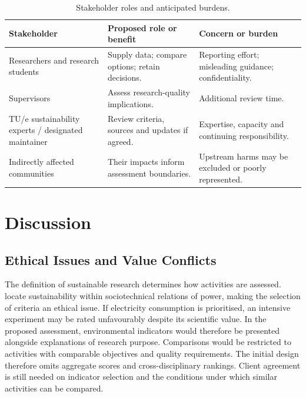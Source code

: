 \documentclass[11pt,a4paper]{article}
\begin{document}
\begin{table}[!htbp]
\centering\small
\begin{tabularx}{\textwidth}{@{}>{\raggedright\arraybackslash}p{}>{\raggedright\arraybackslash}X>{\raggedright\arraybackslash}X@{}}
\toprule
Stakeholder & Proposed role or benefit & Concern or burden \\
\midrule
Researchers and research students & Supply data; compare options; retain decisions. & Reporting effort; misleading guidance; confidentiality. \\
\midrule
Supervisors & Assess research-quality implications. & Additional review time. \\
\midrule
TU/e sustainability experts / designated maintainer & Review criteria, sources and updates if agreed. & Expertise, capacity and continuing responsibility. \\
\midrule
Indirectly affected communities & Their impacts inform assessment boundaries. & Upstream harms may be excluded or poorly represented. \\
\bottomrule
\end{tabularx}
\caption{Stakeholder roles and anticipated burdens.}
\label{tab:stakeholders}
\end{table}

\FloatBarrier
\clearpage
\section{Discussion}

\subsection{Ethical Issues and Value Conflicts}

The definition of sustainable research determines how activities are assessed. \citet{hasselbalch2025sustainability} locate sustainability within sociotechnical relations of power, making the selection of criteria an ethical issue. If electricity consumption is prioritised, an intensive experiment may be rated unfavourably despite its scientific value. In the proposed assessment, environmental indicators would therefore be presented alongside explanations of research purpose. Comparisons would be restricted to activities with comparable objectives and quality requirements. The initial design therefore omits aggregate scores and cross-disciplinary rankings. Client agreement is still needed on indicator selection and the conditions under which similar activities can be compared.
\end{document}
